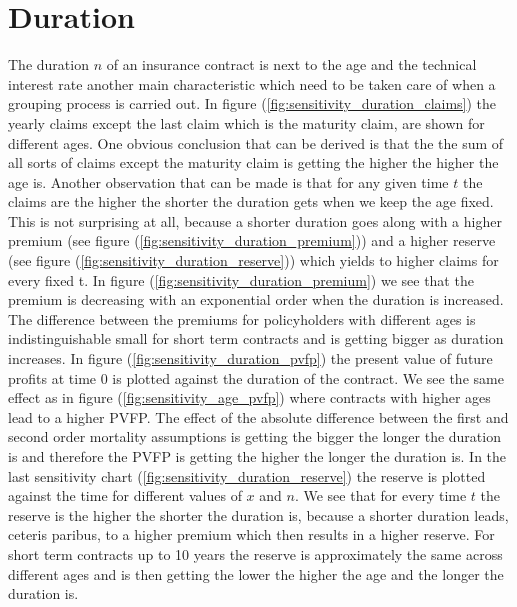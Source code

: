 \section{Duration}
\label{sec:duration}
The duration $n$ of an insurance contract is next to the age and the technical interest rate another main characteristic which need to be taken care of when a grouping process is carried out. In figure (\ref{fig:sensitivity_duration_claims}) the yearly claims except the last claim which is the maturity claim, are shown for different ages. One obvious conclusion that can be derived is that the the sum of all sorts of claims except the maturity claim is getting the higher the higher the age is. Another observation that can be made is that for any given time $t$ the claims are the higher the shorter the duration gets when we keep the age fixed. This is not surprising at all, because a shorter duration goes along with a higher premium (see figure (\ref{fig:sensitivity_duration_premium})) and a higher reserve (see figure (\ref{fig:sensitivity_duration_reserve})) which yields to higher claims for every fixed t.  In figure (\ref{fig:sensitivity_duration_premium}) we see that the premium is decreasing with an exponential order when the duration is increased. The difference between the premiums for policyholders with different ages is indistinguishable small for short term contracts and is getting bigger as duration increases. In figure (\ref{fig:sensitivity_duration_pvfp}) the present  value of future profits at time 0 is plotted against the duration of the contract. We see the same effect as in figure (\ref{fig:sensitivity_age_pvfp}) where contracts with higher ages lead to a higher PVFP. The effect of the absolute difference between the first and second order mortality assumptions is getting the bigger the longer the duration is and therefore the PVFP is getting the higher the longer the duration is. In the last sensitivity chart (\ref{fig:sensitivity_duration_reserve}) the reserve is plotted against the time for different values of $x$ and $n$. We see that for every time $t$ the reserve is the higher the shorter the duration is, because a shorter duration leads, ceteris paribus, to a higher premium which then results in a higher reserve. For short term contracts up to 10 years the reserve is approximately the same across different ages and is then getting the lower the higher the age and the  longer the duration is.

